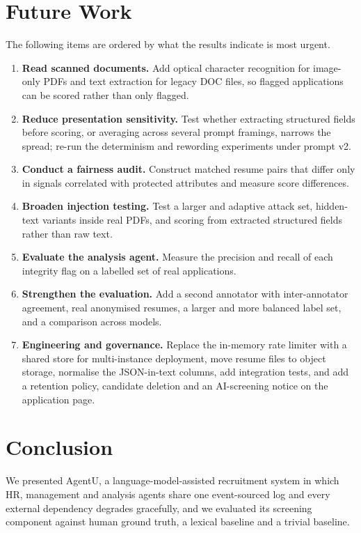 \documentclass[conference]{IEEEtran}
\begin{document}
\section{Future Work}

The following items are ordered by what the results indicate is most urgent.

\begin{enumerate}
\item \textbf{Read scanned documents.} Add optical character recognition for
image-only PDFs and text extraction for legacy DOC files, so flagged
applications can be scored rather than only flagged.
\item \textbf{Reduce presentation sensitivity.} Test whether extracting
structured fields before scoring, or averaging across several prompt framings,
narrows the spread; re-run the determinism and rewording experiments under
prompt v2.
\item \textbf{Conduct a fairness audit.} Construct matched resume pairs that
differ only in signals correlated with protected attributes and measure score
differences.
\item \textbf{Broaden injection testing.} Test a larger and adaptive attack set,
hidden-text variants inside real PDFs, and scoring from extracted structured
fields rather than raw text.
\item \textbf{Evaluate the analysis agent.} Measure the precision and recall of
each integrity flag on a labelled set of real applications.
\item \textbf{Strengthen the evaluation.} Add a second annotator with
inter-annotator agreement, real anonymised resumes, a larger and more balanced
label set, and a comparison across models.
\item \textbf{Engineering and governance.} Replace the in-memory rate limiter
with a shared store for multi-instance deployment, move resume files to object
storage, normalise the JSON-in-text columns, add integration tests, and add a
retention policy, candidate deletion and an AI-screening notice on the
application page.
\end{enumerate}

\section{Conclusion}

We presented AgentU, a language-model-assisted recruitment system in which HR,
management and analysis agents share one event-sourced log and every external
dependency degrades gracefully, and we evaluated its screening component against
human ground truth, a lexical baseline and a trivial baseline.
\end{document}
